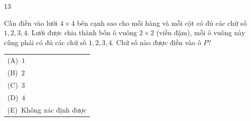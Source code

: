 \documentclass[11pt]{article}
\makeatletter
\newenvironment{probbox}[2]{\begin{probboxT}{#1}{#2}}{\end{probboxT}}
\newcommand{\choicesL}[5]{\par\smallskip\noindent
  \begin{tabular}{@{}l@{}}(A)\ #1\\(B)\ #2\\(C)\ #3\\(D)\ #4\\(E)\ #5\end{tabular}\par}
\makeatother
\begin{document}
\begin{probbox}{13}{\relax}
\begin{minipage}[t]{0.62\linewidth}
Cần điền vào lưới $4\times 4$ bên cạnh sao cho mỗi hàng và mỗi cột có đủ các chữ số $1, 2, 3, 4$. Lưới được chia thành bốn ô vuông
$2\times 2$ (viền đậm), mỗi ô vuông này cũng phải có đủ các chữ số $1, 2, 3, 4$. Chữ số nào được điền vào ô $P$?
\choicesL{$1$}{$2$}{$3$}{$4$}{Không xác định được}
\end{minipage}\hfill
\begin{minipage}[t]{0.33\linewidth}\vspace{4pt}\centering
{}
\end{minipage}
\end{probbox}
\end{document}
